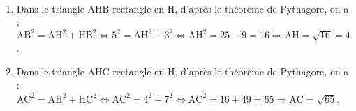 \ \\ [-5mm]
\begin{enumerate}
   \item Dans le triangle AHB rectangle en H, d'après le théorème de Pythagore, on a : \\
   $\text{AB}^2 =\text{AH}^2+\text{HB}^2 \iff 5^2 =\text{AH}^2+3^2 \iff\text{AH}^2 =25-9 =16\Longrightarrow \text{AH} =\sqrt{16} =4$. \\
   \item Dans le triangle AHC rectangle en H, d'après le théorème de Pythagore, on a : \\
   $\text{AC}^2 =\text{AH}^2+\text{HC}^2 \iff \text{AC}^2 =4^2+7^2\iff\text{AC}^2 =16+49 =65\Longrightarrow \text{AC} =\sqrt{65}$. \\
\end{enumerate}
